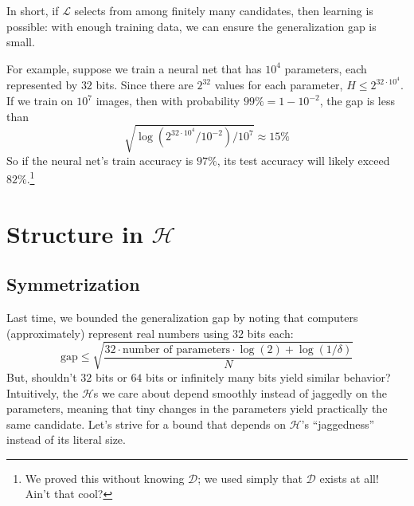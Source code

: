 \documentclass[openany, notitlepage, justified]{tufte-book}
\newcommand{\Dd}{\mathcal{D}}
\newcommand{\Hh}{\mathcal{H}}
\newcommand{\Ll}{\mathcal{L}}
\begin{document}
            In short, if $\Ll$ selects from among finitely many candidates,
            then learning is possible: with enough training data, we can ensure
            the generalization gap is small.

            For example, suppose we train a neural net that has $10^4$
            parameters, each represented by $32$ bits.  Since
            there are $2^{32}$ values for each parameter, $H \leq 2^{32\cdot 10^4}$.
            If we train on $10^7$ images, then with probability $99\%=1-10^{-2}$,
            the gap is less than
            $$
                \sqrt{\log(2^{32\cdot 10^4}/10^{-2})/10^7}
                \approx 15\%
            $$
            So if the neural net's train accuracy is $97\%$,
            its test accuracy will likely exceed $82\%$.\footnote{
                We proved this without knowing $\Dd$; we used simply that $\Dd$
                exists at all!  Ain't that cool?
            }

    \newpage
    \chapter{Structure in $\Hh$}

        \section{Symmetrization}

            Last time, we bounded the generalization gap by
            noting that computers (approximately) represent real
            numbers using $32$ bits each:
            $$
                \text{gap} \leq \sqrt{\frac{32 \cdot \text{number of parameters} \cdot \log(2) + \log(1/\delta)}{N}}
            $$
            But, shouldn't $32$ bits or $64$ bits or infinitely many bits
            yield similar behavior?  Intuitively, the $\Hh$s we care about
            depend smoothly instead of jaggedly on the parameters, meaning that
            tiny changes in the parameters yield practically the same
            candidate.  
            Let's strive for a bound that depends on $\Hh$'s ``jaggedness''
            instead of its literal size.
\end{document}
